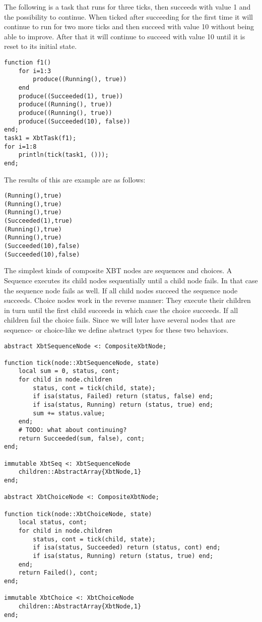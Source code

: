 \documentclass[a4wide]{article}
\begin{document}
The following is a task that runs for three ticks, then succeeds
with value 1 and the possibility to continue.  When ticked after
succeeding for the first time it will continue to run for two more
ticks and then succeed with value 10 without being able to improve.
After that it will continue to succeed with value 10 until it is
reset to its initial state.


\begin{verbatim}
function f1()
    for i=1:3
        produce((Running(), true))
    end
    produce((Succeeded(1), true))
    produce((Running(), true))
    produce((Running(), true))
    produce((Succeeded(10), false))
end;
task1 = XbtTask(f1);
for i=1:8
    println(tick(task1, ()));
end;
\end{verbatim}

The results of this are example are as follows:
\begin{verbatim}
(Running(),true)
(Running(),true)
(Running(),true)
(Succeeded(1),true)
(Running(),true)
(Running(),true)
(Succeeded(10),false)
(Succeeded(10),false)
\end{verbatim}

The simplest kinds of composite XBT nodes are sequences and
choices.  A Sequence executes its child nodes sequentially until a
child node fails.  In that case the sequence node fails as well.
If all child nodes succeed the sequence node succeeds.  Choice
nodes work in the reverse manner: They execute their children in
turn until the first child succeeds in which case the choice
succeeds.  If all children fail the choice fails.  Since we will
later have several nodes that are sequence- or choice-like we
define abstract types for these two behaviors.

\begin{verbatim}
abstract XbtSequenceNode <: CompositeXbtNode;

function tick(node::XbtSequenceNode, state)
    local sum = 0, status, cont;
    for child in node.children
        status, cont = tick(child, state);
        if isa(status, Failed) return (status, false) end;
        if isa(status, Running) return (status, true) end;
        sum += status.value;
    end;
    # TODO: what about continuing?
    return Succeeded(sum, false), cont;
end;

immutable XbtSeq <: XbtSequenceNode
    children::AbstractArray{XbtNode,1}
end;

abstract XbtChoiceNode <: CompositeXbtNode;

function tick(node::XbtChoiceNode, state)
    local status, cont;
    for child in node.children
        status, cont = tick(child, state);
        if isa(status, Succeeded) return (status, cont) end;
        if isa(status, Running) return (status, true) end;
    end;
    return Failed(), cont;
end;

immutable XbtChoice <: XbtChoiceNode
    children::AbstractArray{XbtNode,1}
end;
\end{verbatim}
\end{document}
